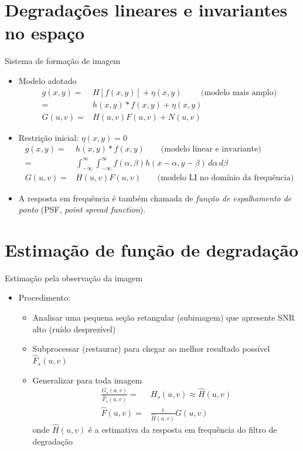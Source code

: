 \section[ slide = true]{Degradações lineares e invariantes no espaço}
\begin{slide}{Sistema de formação de imagem}
	\begin{itemize}
		\item Modelo adotado
			\begin{align*}
				g(x,y) =& H\left [ f(x,y) \right ] + \eta(x,y) \qquad \text{ (modelo mais amplo)}\\
				=& h(x,y)\ast f(x,y) + \eta(x,y) \\
				G(u,v) =& H(u,v)F(u,v) + N(u,v) 
			\end{align*}
		\item Restrição inicial: $\eta(x,y)=0$
			\begin{align*}
				g(x,y) =& h(x,y)\ast f(x,y)\qquad \text{(modelo linear e invariante)}\\
				=&\int_{-\infty}^\infty\int_{-\infty}^\infty f(\alpha,\beta) h(x-\alpha, y-\beta)\, d\alpha\, d\beta\\
				G(u,v) =& H(u,v)F(u,v) \qquad \text{(modelo LI no domínio da frequência)}
			\end{align*}
		\item A resposta em frequência é também chamada de \emph{função de espalhamento de ponto} (PSF, \emph{point spread function}).

	\end{itemize}
\end{slide}

\section[ slide = true]{Estimação de função de degradação}
\begin{slide}{Estimação pela observação da imagem}
	\begin{itemize}
		\item Procedimento:
			\begin{itemize}
				\item Analisar uma pequena seção retangular (subimagem) que apresente SNR alto (ruído desprezível)
				\item Subprocessar (restaurar) para chegar ao melhor resultado possível $\hat F_s(u,v)$
				\item Generalizar para toda imagem
					\begin{align*}
						\frac{G_s(u,v)}{\hat F_s(u,v)} =& H_s(u,v)\approx \hat H(u,v)\\
						\hat F(u,v) =& \frac{1}{\hat H(u,v)} G(u,v)
					\end{align*}
					onde $\hat H(u,v)$ é a estimativa da resposta em frequência do filtro de degradação
			\end{itemize}
	\end{itemize}
\end{slide}

